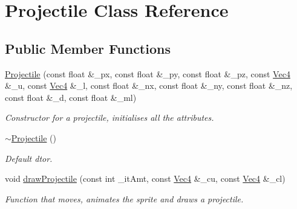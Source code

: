 \hypertarget{classProjectile}{
\section{Projectile Class Reference}
\label{classProjectile}
}
\subsection*{Public Member Functions}
\begin{DoxyCompactItemize}
\item 
\hyperlink{classProjectile_ab1e373ca8aa5c3c064b272634167be30}{Projectile} (const float \&\_\-px, const float \&\_\-py, const float \&\_\-pz, const \hyperlink{classVec4}{Vec4} \&\_\-u, const \hyperlink{classVec4}{Vec4} \&\_\-l, const float \&\_\-nx, const float \&\_\-ny, const float \&\_\-nz, const float \&\_\-d, const float \&\_\-ml)
\begin{DoxyCompactList}\small\item\em Constructor for a projectile, initialises all the attributes. \item\end{DoxyCompactList}\item 
\hypertarget{classProjectile_a94903e021fa2edab60ba3836ca0b937d}{
\hyperlink{classProjectile_a94903e021fa2edab60ba3836ca0b937d}{$\sim$Projectile} ()}
\label{classProjectile_a94903e021fa2edab60ba3836ca0b937d}

\begin{DoxyCompactList}\small\item\em Default dtor. \item\end{DoxyCompactList}\item 
void \hyperlink{classProjectile_af4bc39a4bae46e9bbd532a659be199ef}{drawProjectile} (const int \_\-itAmt, const \hyperlink{classVec4}{Vec4} \&\_\-cu, const \hyperlink{classVec4}{Vec4} \&\_\-cl)
\begin{DoxyCompactList}\small\item\em Function that moves, animates the sprite and draws a projectile. \item\end{DoxyCompactList}\end{DoxyCompactItemize}
